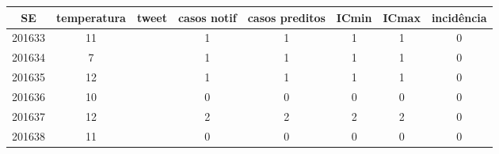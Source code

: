 \begin{tabular}{c|ccccccc}
  \hline
SE & temperatura & tweet & casos notif & casos preditos & ICmin & ICmax & incidência \\ 
  \hline
201633 & 11 &  & 1 & 1 & 1 & 1 & 0 \\ 
  201634 & 7 &  & 1 & 1 & 1 & 1 & 0 \\ 
  201635 & 12 &  & 1 & 1 & 1 & 1 & 0 \\ 
  201636 & 10 &  & 0 & 0 & 0 & 0 & 0 \\ 
  201637 & 12 &  & 2 & 2 & 2 & 2 & 0 \\ 
  201638 & 11 &  & 0 & 0 & 0 & 0 & 0 \\ 
   \hline
\end{tabular}
